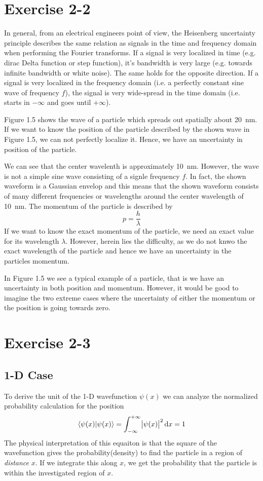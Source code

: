 \section{Exercise 2-2}
In general, from an electrical engineers point of view, the Heisenberg
uncertainty principle describes the same relation as signals in the time and
frequency domain when performing the Fourier transforms. If a signal is very
localized in time (e.g. dirac Delta function or step function), it's
bandwidth is very large (e.g. towards infinite bandwidth or white noise).
The same holds for the opposite direction. If a signal is very localized in
the frequency domain (i.e. a perfectly constant sine wave of frequency $f$),
the signal is very wide-spread in the time domain (i.e. starts in
$-\infty$ and goes until $+\infty$).

Figure 1.5 shows the wave of a particle which spreads out spatially about
\SI{20}{\nano\meter}. If we want to know the position of the particle
described by the shown wave in Figure 1.5, we can not perfectly localize
it. Hence, we have an uncertainty in position of the particle.

We can see that the center wavelenth is approximately \SI{10}{\nano\meter}.
However, the wave is not a simple sine wave consisting of a signle frequency
$f$. In fact, the shown waveform is a Gaussian envelop and this means that
the shown waveform consists of many different frequencies or wavelengths
around the center wavelength of \SI{10}{\nano\meter}. The momentum of the
particle is described by
\[
	p = \frac{h}{\lambda}
\]
If we want to know the exact momentum of the particle, we need an exact
value for its wavelength $\lambda$. However, herein lies the difficulty,
as we do not knwo the exact wavelength of the particle and hence we
have an uncertainty in the particles momentum.

In Figure 1.5 we see a typical example of a particle, that is we have an
uncertainty in both position and momentum. However, it would be good to
imagine the two extreme cases where the uncertainty of either the momentum
or the position is going towards zero.

\section{Exercise 2-3}

\subsection{1-D Case}
To derive the unit of the 1-D wavefunction $\psi(x)$ we can analyze the
normalized probability calculation for the position
\[
	\braket{\psi(x)|\psi(x)}
	= \int_{-\infty}^{+\infty}{\abs{\psi(x)}^2} \dif x
	= 1
\]
The physical interpretation of this equaiton is that the square of the 
wavefunction gives the probability(density) to find the particle in a
region of \emph{distance} $x$. If we integrate this along $x$, we get
the probability that the particle is within the investigated region of $x$.

